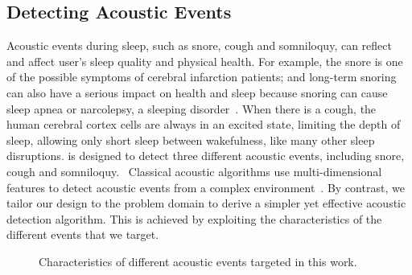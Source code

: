 \subsection{ Detecting Acoustic Events \label{sec:acoustic}}
Acoustic events during sleep, such as snore, cough and somniloquy, can reflect and affect user's sleep quality and physical health. For
example, the snore is one of the possible symptoms of cerebral infarction patients; and long-term snoring can also have a serious impact on
health and sleep because snoring can cause sleep apnea or narcolepsy, a sleeping disorder~\cite{snoring2016,snoring2013}. When there is a
cough, the human cerebral cortex cells are always in an excited state, limiting the depth of sleep, allowing only short sleep between
wakefulness, like many other sleep disruptions. {\systemname} is designed to detect three different acoustic events, including snore, cough
and somniloquy. \ Classical acoustic algorithms use multi-dimensional features to detect acoustic events from a complex
environment~\cite{gu2016sleep}. By contrast, we tailor our design to the problem domain to derive a simpler yet effective acoustic
detection algorithm. This is achieved by exploiting the characteristics of the different events that we target.


\begin{figure}[!t]
\centering
\caption{Characteristics of different acoustic events targeted in this work.}\label{acoustic}
\end{figure}




